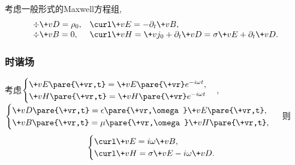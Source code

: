 \documentclass[hidelinks]{ctexart}
\begin{document}

考虑一般形式的Maxwell方程组,
\[ \begin{array}{ll}
    \div \+vD = \rho_0, & \curl \+vE = -\partial_t \+vB, \\
    \div \+vB = 0, & \curl \+vH = \+vj_0 + \partial_t \+vD = \sigma \+vE + \partial_t \+vD.
\end{array} \]

\subsubsection{时谐场} %
\label{ssub:时谐场}

考虑$\begin{cases}
    \+vE\pare{\+vr,t} = \+vE\pare{\+vr}e^{-i\omega t}, \\
    \+vH\pare{\+vr,t} = \+vH\pare{\+vr}e^{-i\omega t}
\end{cases}$, $\begin{cases}
    \+vD\pare{\+vr,t} = \epsilon\pare{\+vr,\omega} \+vE\pare{\+vr,t}, \\
    \+vB\pare{\+vr,t} = \mu\pare{\+vr,\omega} \+vH\pare{\+vr,t},
\end{cases}$ 则
\[ \begin{cases}
    \curl \+vE = i\omega \+vB, \\
    \curl \+vH = \sigma \+vE - i\omega \+vD.
\end{cases} \]
\end{document}

